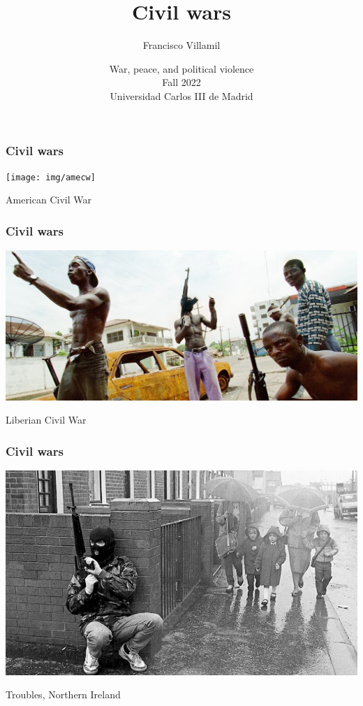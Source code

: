 \documentclass[utf8, xcolor=dvipsnames]{beamer}
\title[Civil wars]{Civil wars}
\author[Francisco Villamil]{Francisco Villamil}
\date[UC3M / Fall 2022]{War, peace, and political violence\\Fall 2022\\Universidad Carlos III de Madrid}
\begin{document}
\begin{frame}
  \titlepage
\end{frame}


\begin{frame}
\frametitle{Civil wars}
\centering

\texttt{[image: img/amecw]}

American Civil War

\end{frame}

\begin{frame}
\frametitle{Civil wars}
\centering

\includegraphics[width = \textwidth]{img/liberia}

Liberian Civil War

\end{frame}

\begin{frame}
\frametitle{Civil wars}
\centering

\includegraphics[width = \textwidth]{img/troubles}

Troubles, Northern Ireland

\end{frame}
\end{document}

